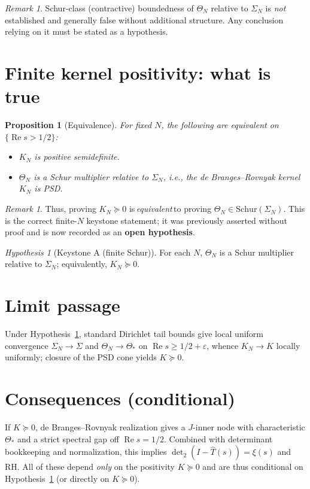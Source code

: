 \documentclass[11pt]{article}
\newcommand{\ReS}{\operatorname{Re}}
\newcommand{\Ths}{\Theta_*}
\newcommand{\Si}{\Sigma}
\newcommand{\SiN}{\Sigma_N}
\newcommand{\ThN}{\Theta_N}
\newcommand{\kN}{K_N}
\newcommand{\detTwo}{\det\nolimits_{2}}
\newcommand{\xiFun}{\xi}
\theoremstyle{plain}
\newtheorem{proposition}[theorem]{Proposition}
\theoremstyle{definition}
\theoremstyle{remark}
\newtheorem{remark}[theorem]{Remark}
\newtheorem{hypothesis}[theorem]{Hypothesis}
\begin{document}
\begin{remark}
Schur-class (contractive) boundedness of $\ThN$ relative to $\SiN$ is \emph{not} established and generally false without additional structure. Any conclusion relying on it must be stated as a hypothesis.
\end{remark}

\section{Finite kernel positivity: what is true}
\begin{proposition}[Equivalence]\label{prop:equivalence}
For fixed $N$, the following are equivalent on $\{\ReS s>1/2\}$:
\begin{itemize}
  \item[(i)] $\kN$ is positive semidefinite.
  \item[(ii)] $\ThN$ is a Schur multiplier relative to $\SiN$, i.e., the de Branges--Rovnyak kernel $\kN$ is PSD.
\end{itemize}
\end{proposition}

\begin{remark}
Thus, proving $\kN\succeq 0$ is\,\emph{equivalent}\,to proving $\ThN\in \mathrm{Schur}(\SiN)$. This is the correct finite-$N$ keystone statement; it was previously asserted without proof and is now recorded as an \textbf{open hypothesis}.
\end{remark}

\begin{hypothesis}[Keystone A (finite Schur)]\label{hyp:finite-schur}
For each $N$, $\ThN$ is a Schur multiplier relative to $\SiN$; equivalently, $\kN\succeq 0$.
\end{hypothesis}

\section{Limit passage}
Under Hypothesis~\ref{hyp:finite-schur}, standard Dirichlet tail bounds give local uniform convergence $\SiN\to\Si$ and $\ThN\to\Ths$ on $\ReS s\ge 1/2+\varepsilon$, whence $\kN\to K$ locally uniformly; closure of the PSD cone yields $K\succeq 0$.

\section{Consequences (conditional)}
If $K\succeq 0$, de Branges--Rovnyak realization gives a $J$-inner node with characteristic $\Ths$ and a strict spectral gap off $\ReS s=1/2$. Combined with determinant bookkeeping and normalization, this implies $\detTwo(I-\widehat{T}(s))=\xiFun(s)$ and RH. All of these depend \emph{only} on the positivity $K\succeq 0$ and are thus conditional on Hypothesis~\ref{hyp:finite-schur} (or directly on $K\succeq 0$).
\end{document}
